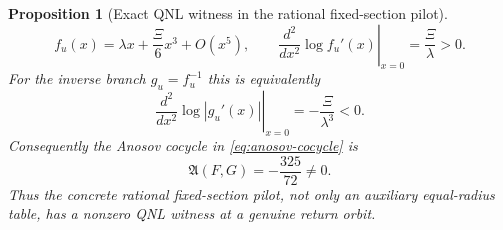\documentclass[11pt]{article}
\newtheorem{proposition}[theorem]{Proposition}
\begin{document}
\begin{proposition}[Exact QNL witness in the rational fixed-section pilot]
\begin{equation}
 f_u(x)=\lambda x+\frac{\Xi}{6}x^3+O(x^5),
 \qquad
 \left.\frac{d^2}{dx^2}\log f_u'(x)\right|_{x=0}
 =\frac{\Xi}{\lambda}>0.
\end{equation}
For the inverse branch $g_u=f_u^{-1}$ this is equivalently
\begin{equation}
\label{eq:fixed-section-pilot-inverse-distortion-seed}
 \left.\frac{d^2}{dx^2}\log |g_u'(x)|\right|_{x=0}
 =-\frac{\Xi}{\lambda^3}<0.
\end{equation}
Consequently the Anosov cocycle in
\eqref{eq:anosov-cocycle} is
\begin{equation}
\label{eq:fixed-section-pilot-anosov-cocycle}
 \mathfrak A(F,G)=-\frac{325}{72}\ne0.
\end{equation}
Thus the concrete rational fixed-section pilot, not only an auxiliary
equal-radius table, has a nonzero QNL witness at a genuine return orbit.
\end{proposition}
\end{document}
